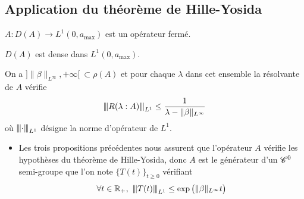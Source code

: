 \subsection{Application du théorème de Hille-Yosida}
\begin{frame}
    \begin{proposition}
        $A : D(A) \rightarrow L^1(0,a_{\max})$ est un opérateur fermé.
    \end{proposition}
    \pause
    \begin{proposition}
        $D(A)$ est dense dans $L^1(0,a_{\max})$.
    \end{proposition}
    \pause
    \begin{proposition}
        On a $]\|\beta\|_{L^{\infty}},+\infty[ \ \subset \rho(A)$ et pour chaque $\lambda$ dans cet ensemble la résolvante de $A$ vérifie
        \begin{equation*}
            {\left\vert\kern-0.25ex\left\vert \kern-0.25ex\left\vert R(\lambda : A) \right\vert\kern-0.25ex\right\vert\kern-0.25ex\right\vert}_{L^1} \leq \frac{1}{\lambda - \|\beta\|_{L^\infty}}
        \end{equation*}
        où ${\left\vert\kern-0.25ex\left\vert \kern-0.25ex\left\vert \cdot \right\vert\kern-0.25ex\right\vert\kern-0.25ex\right\vert}_{L^1}$ désigne la norme d'opérateur de $L^1$.
    \end{proposition}
    \pause
    \begin{itemize}
        \item Les trois propositions précédentes nous assurent que l'opérateur $A$ vérifie les hypothèses du théorème de Hille-Yosida, donc $A$ est le générateur d'un $\mathscr{C}^0$ semi-groupe que l'on note $\big\{T(t)\big\}_{t \geq 0}$ vérifiant 
        \begin{equation*}
            \forall t \in \bbR_+, \ \vertiii{T(t)}_{L^1} \leq \exp\big({\|\beta\|_{L^\infty}t}\big)
        \end{equation*}
    \end{itemize}
\end{frame}

